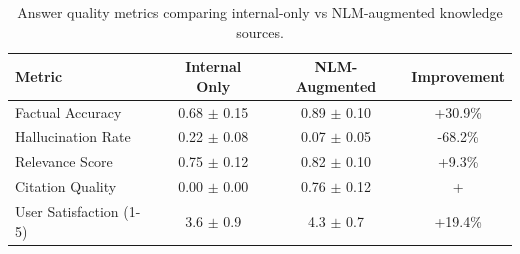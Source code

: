 \begin{table}[t]
\centering
\caption{Answer quality metrics comparing internal-only vs NLM-augmented knowledge sources.}
\label{tab:knowledge}
\begin{tabular}{lccc}
\toprule
Metric & Internal Only & NLM-Augmented & Improvement \\
\midrule
Factual Accuracy & 0.68 $\pm$ 0.15 & 0.89 $\pm$ 0.10 & +30.9\% \\
Hallucination Rate & 0.22 $\pm$ 0.08 & 0.07 $\pm$ 0.05 & -68.2\% \\
Relevance Score & 0.75 $\pm$ 0.12 & 0.82 $\pm$ 0.10 & +9.3\% \\
Citation Quality & 0.00 $\pm$ 0.00 & 0.76 $\pm$ 0.12 & +\\%
User Satisfaction (1-5) & 3.6 $\pm$ 0.9 & 4.3 $\pm$ 0.7 & +19.4\% \\
\bottomrule
\end{tabular}
\end{table}